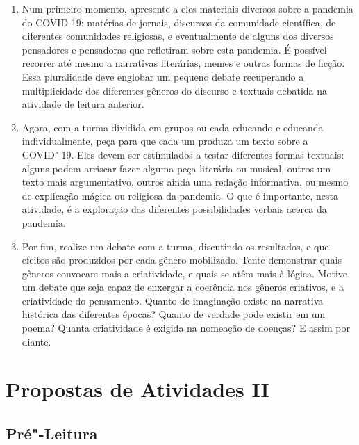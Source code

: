 \documentclass[12pt]{extarticle}
\begin{document}
\begin{enumerate}
\item Num primeiro momento, apresente a eles materiais diversos sobre a
pandemia do COVID-19: matérias de jornais, discursos da comunidade
científica, de diferentes comunidades religiosas, e eventualmente de
alguns dos diversos pensadores e pensadoras que refletiram sobre esta
pandemia. É possível recorrer até mesmo a narrativas literárias, memes e
outras formas de ficção. Essa pluralidade deve englobar um pequeno
debate recuperando a multiplicidade dos diferentes gêneros do discurso e
textuais debatida na atividade de leitura anterior.

\item Agora, com a turma dividida em grupos ou cada educando e educanda
individualmente, peça para que cada um produza um texto sobre a
COVID"-19. Eles devem ser estimulados a testar diferentes formas
textuais: alguns podem arriscar fazer alguma peça literária ou musical,
outros um texto mais argumentativo, outros ainda uma redação
informativa, ou mesmo de explicação mágica ou religiosa da pandemia. O
que é importante, nesta atividade, é a exploração das diferentes
possibilidades verbais acerca da pandemia.

\item Por fim, realize um debate com a turma, discutindo os resultados, e que
efeitos são produzidos por cada gênero mobilizado. Tente demonstrar
quais gêneros convocam mais a criatividade, e quais se atêm mais à
lógica. Motive um debate que seja capaz de enxergar a coerência nos
gêneros criativos, e a criatividade do pensamento. Quanto de imaginação
existe na narrativa histórica das diferentes épocas? Quanto de verdade
pode existir em um poema? Quanta criatividade é exigida na nomeação de
doenças? E assim por diante.
\end{enumerate}


\section{Propostas de Atividades II}


\subsection{Pré"-Leitura}

\end{document}
